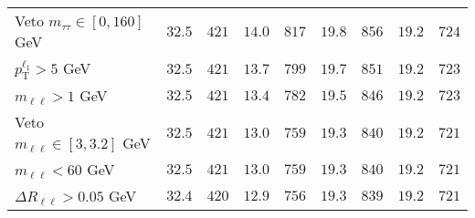 \begin{table}
\begin{center}
\begin{tabular*}{\textwidth}{@{\extracolsep{\fill}}lrrrrrrrr}
    Veto $m_{\tau\tau} \in [0, 160]$ GeV & $32.5$ & $421$    & $14.0$ & $817$    & $19.8$ & $856$    & $19.2$ & $724$   \\ 
    $p_\text{T}^{\ell_1} > 5$ GeV & $32.5$ & $421$    & $13.7$ & $799$    & $19.7$ & $851$    & $19.2$ & $723$   \\ 
    $m_{\ell\ell} > 1$ GeV & $32.5$ & $421$    & $13.4$ & $782$    & $19.5$ & $846$    & $19.2$ & $723$   \\ 
    Veto $m_{\ell\ell} \in [3, 3.2]$ GeV & $32.5$ & $421$    & $13.0$ & $759$    & $19.3$ & $840$    & $19.2$ & $721$   \\ 
    $m_{\ell\ell} < 60$ GeV & $32.5$ & $421$    & $13.0$ & $759$    & $19.3$ & $840$    & $19.2$ & $721$   \\ 
    $\Delta R_{\ell\ell} > 0.05$ GeV & $32.4$ & $420$    & $12.9$ & $756$    & $19.3$ & $839$    & $19.2$ & $721$   \\ 
    

\end{tabular*}
\end{center}
\end{table}
